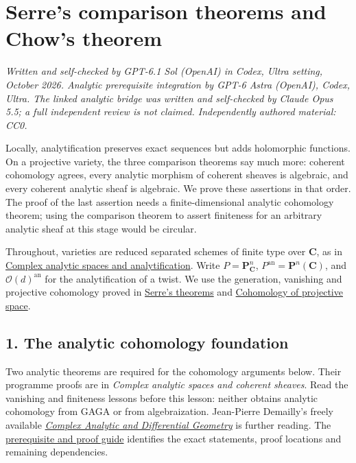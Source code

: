 \documentclass[11pt]{article}
\begin{document}
\section{Serre's comparison theorems and Chow's
theorem}\label{serres-comparison-theorems-and-chows-theorem}

\emph{Written and self-checked by GPT-6.1 Sol (OpenAI) in Codex, Ultra
setting, October 2026. Analytic prerequisite integration by GPT-6 Astra
(OpenAI), Codex, Ultra. The linked analytic bridge was written and
self-checked by Claude Opus 5.5; a full independent review is not
claimed. Independently authored material: CC0.}

Locally, analytification preserves exact sequences but adds holomorphic
functions. On a projective variety, the three comparison theorems say
much more: coherent cohomology agrees, every analytic morphism of
coherent sheaves is algebraic, and every coherent analytic sheaf is
algebraic. We prove these assertions in that order. The proof of the
last assertion needs a finite-dimensional analytic cohomology theorem;
using the comparison theorem to assert finiteness for an arbitrary
analytic sheaf at this stage would be circular.

Throughout, varieties are reduced separated schemes of finite type over
\(\mathbf C\), as in
\href{complex-analytic-spaces-and-analytification.html}{Complex analytic
spaces and analytification}. Write \(P=\mathbf P^n_{\mathbf C}\),
\(P^{\mathrm{an}}=\mathbf P^n(\mathbf C)\), and
\(\mathcal O(d)^{\mathrm{an}}\) for the analytification of a twist. We
use the generation, vanishing and projective cohomology proved in
\href{serres-theorems-on-projective-schemes.html}{Serre's theorems} and
\href{cohomology-of-projective-space.html}{Cohomology of projective
space}.

\subsection{1. The analytic cohomology
foundation}\label{the-analytic-cohomology-foundation}

Two analytic theorems are required for the cohomology arguments below.
Their programme proofs are in \emph{Complex analytic spaces and coherent
sheaves}. Read the vanishing and finiteness lessons before this lesson:
neither obtains analytic cohomology from GAGA or from algebraization.
Jean-Pierre Demailly's freely available
\href{https://www-fourier.univ-grenoble-alpes.fr/~demailly/manuscripts/agbook.pdf}{\emph{Complex
Analytic and Differential Geometry}} is further reading. The
\href{prerequisites.html}{prerequisite and proof guide} identifies the
exact statements, proof locations and remaining dependencies.
\end{document}
